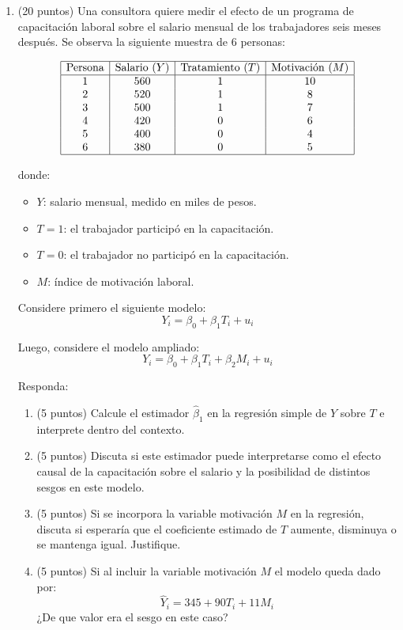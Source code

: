 \documentclass[10pt,a4paper]{article}
\begin{document}
\begin{enumerate}
    \item (20 puntos) Una consultora quiere medir el efecto de un programa de capacitación laboral sobre el salario mensual de los trabajadores seis meses después. Se observa la siguiente muestra de 6 personas:

    \[
    \begin{array}{|c|c|c|c|}
    \hline
    \text{Persona} & \text{Salario } (Y) & \text{Tratamiento } (T) & \text{Motivación } (M)\\
    \hline
    1 & 560 & 1 & 10\\
    2 & 520 & 1 & 8\\
    3 & 500 & 1 & 7\\
    4 & 420 & 0 & 6\\
    5 & 400 & 0 & 4\\
    6 & 380 & 0 & 5 \\
    \hline
    \end{array}
    \]

    donde:
    \begin{itemize}
        \item \(Y\): salario mensual, medido en miles de pesos.
        \item \(T=1\): el trabajador participó en la capacitación.
        \item \(T=0\): el trabajador no participó en la capacitación.
        \item \(M\): índice de motivación laboral.
    \end{itemize}

    Considere primero el siguiente modelo:
    \[
    Y_i=\beta_0+\beta_1 T_i+u_i
    \]

    Luego, considere el modelo ampliado:
    \[
    Y_i=\beta_0+\beta_1 T_i+\beta_2 M_i+u_i
    \]

    Responda:

    \begin{enumerate}
        \item (5 puntos) Calcule el estimador \(\hat{\beta}_1\) en la regresión simple de \(Y\) sobre \(T\) e interprete dentro del contexto.
        \item (5 puntos) Discuta si este estimador puede interpretarse como el efecto causal de la capacitación sobre el salario y la posibilidad de distintos sesgos en este modelo.
        \item (5 puntos) Si se incorpora la variable motivación \(M\) en la regresión, discuta si esperaría que el coeficiente estimado de \(T\) aumente, disminuya o se mantenga igual. Justifique.
        \item (5 puntos) Si al incluir la variable motivación \(M\) el modelo queda dado por:
        $$\hat{Y}_i = 345 + 90T_i + 11M_i$$
        ¿De que valor era el sesgo en este caso?
    \end{enumerate}


\end{enumerate}
\end{document}
